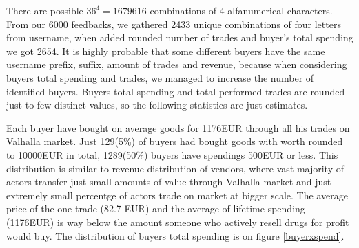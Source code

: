 \documentclass[
  digital, %
  table,   %
  lof,     %
  lot,     %
  oneside
]{fithesis3}
\begin{document}
There are possible $36^4=1679616$ combinations of 4 alfanumerical characters.
From our 6000 feedbacks, we gathered 2433 unique combinations of four letters from username,
when added rounded number of trades and buyer's total spending we got 2654.
It is highly probable that some different buyers have the same username prefix, suffix, amount of 
trades and revenue, because when considering buyers total spending and trades, we managed to increase
the number of identified buyers. Buyers total spending and total performed trades are rounded just to few distinct values, so the
following statistics are just estimates.

Each buyer have bought on average goods for 1176EUR through all his trades on Valhalla market.
Just 129(5\%) of buyers had bought goods with worth rounded to 10000EUR in total,
 1289(50\%) buyers have spendings 500EUR or less.
This distribution is similar to revenue distribution of vendors, where
vast majority of actors transfer just small amounts of value through Valhalla market and
just extremely small percentge of actors trade on market at bigger scale.
The average price of the one trade (82.7 EUR) and the average of lifetime spending (1176EUR)
is way below the amount someone who actively resell drugs for profit would buy.
The distribution of buyers total spending is on figure \ref{buyerxspend}.
\end{document}
